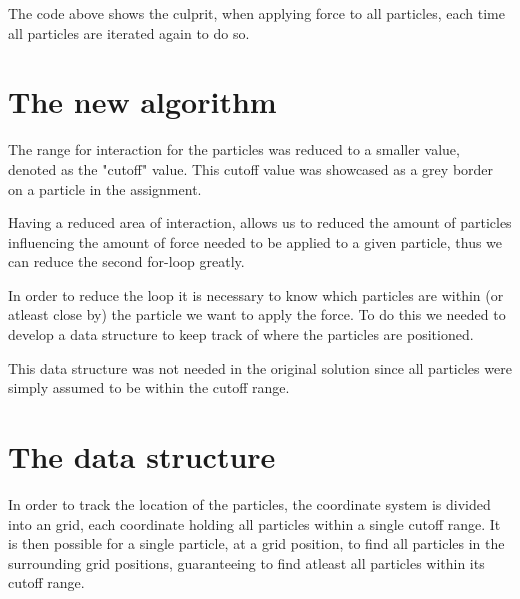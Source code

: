 \documentclass[a4paper,11pt,oneside]{book}
\begin{document}
The code above shows the culprit, when applying force to all particles, each time all particles are iterated again to do so.

\section{The new algorithm}
The range for interaction for the particles was reduced to a smaller value, denoted as the "cutoff" value. This cutoff value was showcased as a grey border on a particle in the assignment.

Having a reduced area of interaction, allows us to reduced the amount of particles influencing the amount of force needed to be applied to a given particle, thus we can reduce the second for-loop greatly.

In order to reduce the loop it is necessary to know which particles are within (or atleast close by) the particle we want to apply the force. To do this we needed to develop a data structure to keep track of where the particles are positioned.

This data structure was not needed in the original solution since all particles were simply assumed to be within the cutoff range.

\section{The data structure}
In order to track the location of the particles, the coordinate system is divided into an grid, each coordinate holding all particles within a single cutoff range. It is then possible for a single particle, at a grid position, to find all particles in the surrounding grid positions, guaranteeing to find atleast all particles within its cutoff range.
\end{document}

